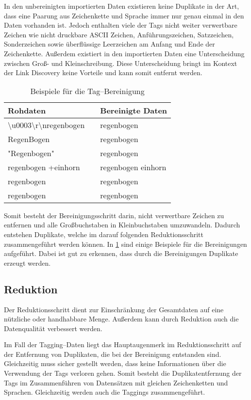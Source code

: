 In den unbereinigten importierten Daten existieren keine Duplikate in der Art, dass eine Paarung aus Zeichenkette und Sprache immer nur genau einmal in den Daten vorhanden ist. Jedoch enthalten viele der Tags nicht weiter verwertbare Zeichen wie nicht druckbare ASCII Zeichen, Anführungszeichen, Satzzeichen, Sonderzeichen sowie überflüssige Leerzeichen am Anfang und Ende der Zeichenkette. Außerdem existiert in den importierten Daten eine Unterscheidung zwischen Groß- und Kleinschreibung. Diese Unterscheidung bringt im Kontext der Link Discovery keine Vorteile und kann somit entfernt werden.

\begin{table}[h]
\centering
\begin{tabular}{lcl}
    \toprule
    Rohdaten & \phantom{abc} & Bereinigte Daten \\
    \midrule
    \textbackslash u0003\textbackslash r\textbackslash nregenbogen && regenbogen \\
    RegenBogen && regenbogen \\
    "Regenbogen" && regenbogen \\
    regenbogen +einhorn && regenbogen einhorn\\
    \phantom{abc} regenbogen && regenbogen \\
    regenbogen && regenbogen \\
    \bottomrule
\end{tabular}
\caption{Beispiele für die Tag--Bereinigung}
\label{tab:tag_cleaning}
\end{table}

Somit besteht der Bereinigungsschritt darin, nicht verwertbare Zeichen zu entfernen und alle Großbuchstaben in Kleinbuchstaben umzuwandeln. Dadurch entstehen Duplikate, welche im darauf folgenden Reduktionsschritt zusammengeführt werden können. In \cref{tab:tag_cleaning} sind einige Beispiele für die Bereinigungen aufgeführt. Dabei ist gut zu erkennen, dass durch die Bereinigungen Duplikate erzeugt werden.

\subsection{Reduktion}

Der Reduktionsschritt dient zur Einschränkung der Gesamtdaten auf eine nützliche oder handhabbare Menge. Außerdem kann durch Reduktion auch die Datenqualität verbessert werden.

Im Fall der Tagging--Daten liegt das Hauptaugenmerk im Reduktionsschritt auf der Entfernung von Duplikaten, die bei der Bereinigung entstanden sind. Gleichzeitig muss sicher gestellt werden, dass keine Informationen über die Verwendung der Tags verloren gehen. Somit besteht die Duplikatentfernung der Tags im Zusammenführen von Datensätzen mit gleichen Zeichenketten und Sprachen. Gleichzeitig werden auch die Taggings zusammengeführt.

